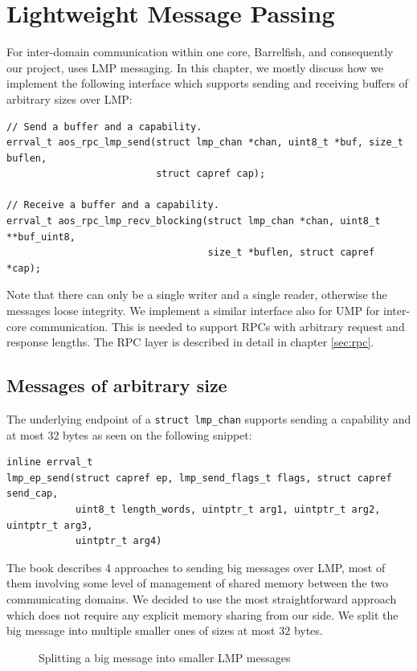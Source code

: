 \chapter{Lightweight Message Passing}
For inter-domain communication within one core, Barrelfish, and consequently our project, uses LMP
messaging. In this chapter, we mostly discuss how we implement the following interface which supports sending and receiving buffers of arbitrary sizes over LMP:
\begin{verbatim}
// Send a buffer and a capability.
errval_t aos_rpc_lmp_send(struct lmp_chan *chan, uint8_t *buf, size_t buflen,
                          struct capref cap);

// Receive a buffer and a capability.
errval_t aos_rpc_lmp_recv_blocking(struct lmp_chan *chan, uint8_t **buf_uint8,
                                   size_t *buflen, struct capref *cap);
\end{verbatim}

Note that there can only be a single writer and a single reader, otherwise the messages loose integrity.
We implement a similar interface also for UMP for inter-core communication. This is needed to support RPCs with arbitrary request and response lengths. The RPC layer is described in detail in chapter \ref{sec:rpc}.

\section{Messages of arbitrary size}
The underlying endpoint of a \texttt{struct lmp_chan} supports
sending a capability and at most $32$ bytes as seen on the following snippet:
\begin{verbatim}
inline errval_t
lmp_ep_send(struct capref ep, lmp_send_flags_t flags, struct capref send_cap,
            uint8_t length_words, uintptr_t arg1, uintptr_t arg2, uintptr_t arg3,
            uintptr_t arg4)
\end{verbatim}



The book describes 4 approaches to sending big messages over LMP, most of them involving some level of management of shared memory
between the two communicating domains. We decided to use the most straightforward approach which does not
require any explicit memory sharing from our side. We split the big message into multiple smaller
ones of sizes at most $32$ bytes.

\begin{figure}[ht]
    \centering
        \scalebox{0.7}{
            
        }
    \caption{Splitting a big message into smaller LMP messages}
    \label{fig:lmp_msg}
\end{figure}

